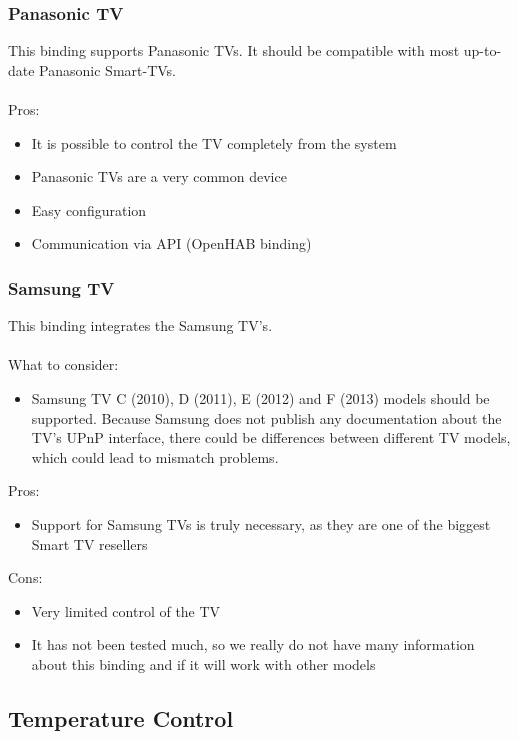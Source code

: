 \subsubsection{Panasonic TV}
This binding supports Panasonic TVs. It should be compatible with most up-to-date Panasonic Smart-TVs.\\~\\
Pros:
\begin{itemize}
	\item It is possible to control the TV completely from the system
	\item Panasonic TVs are a very common device
	\item Easy configuration
	\item Communication via API (OpenHAB binding)
\end{itemize}

\subsubsection{Samsung TV}
This binding integrates the Samsung TV’s.\\~\\
What to consider:
\begin{itemize}
	\item Samsung TV C (2010), D (2011), E (2012) and F (2013) models should be supported. Because Samsung does not publish any
	documentation about the TV’s UPnP interface, there could be differences between different TV models, which could lead to mismatch
	problems.
\end{itemize}
Pros:
\begin{itemize}
	\item Support for Samsung TVs is truly necessary, as they are one of the biggest Smart TV resellers
\end{itemize}
Cons:
\begin{itemize}
	\item Very limited control of the TV
	\item It has not been tested much, so we really do not have many information about this binding and if it will work with other models
\end{itemize}

\subsection{Temperature Control}

